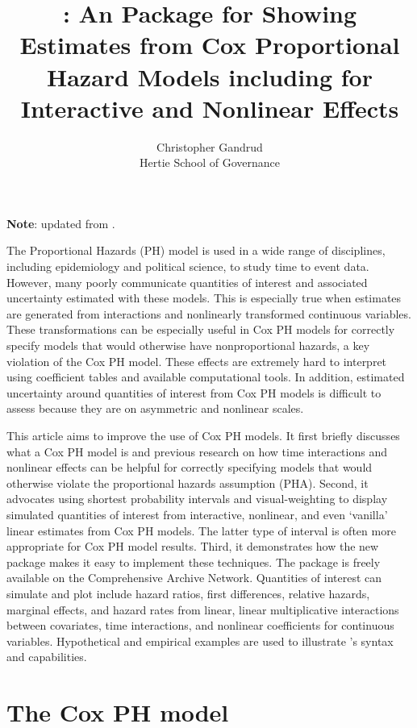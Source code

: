 \documentclass[nojss]{jss}\usepackage[]{graphicx}\usepackage[]{color}
\author{Christopher Gandrud \\ Hertie School of Governance}
\title{\pkg{simPH}: An \proglang{R} Package for Showing Estimates from Cox Proportional Hazard Models including for Interactive and Nonlinear Effects}
\begin{document}
\textbf{Note}: updated from \cite{gandrud2015}.

\vspace{0.5cm}

The \cite{cox1972} Proportional Hazards (PH) model is used in a wide range of disciplines, including epidemiology and political science, to study time to event data. However, many poorly communicate quantities of interest and associated uncertainty estimated with these models. This is especially true when estimates are generated from interactions and nonlinearly transformed continuous variables. These transformations can be especially useful in Cox PH models for correctly specify models that would otherwise have nonproportional hazards, a key violation of the Cox PH model. These effects are extremely hard to interpret using coefficient tables and available computational tools. In addition, estimated uncertainty around quantities of interest from Cox PH models is difficult to assess because they are on asymmetric and nonlinear scales.

This article aims to improve the use of Cox PH models. It first briefly discusses what a Cox PH model is and previous research on how time interactions and nonlinear effects can be helpful for correctly specifying models that would otherwise violate the proportional hazards assumption (PHA). Second, it advocates using shortest probability intervals and visual-weighting to display simulated quantities of interest from interactive, nonlinear, and even `vanilla' linear estimates from Cox PH models. The latter type of interval is often more appropriate for Cox PH model results. Third, it demonstrates how the new  \citep{CiteR} package  \citep{R-simPH} makes it easy to implement these techniques. The package is freely available on the Comprehensive  Archive Network. Quantities of interest  can simulate and plot include hazard ratios, first differences, relative hazards, marginal effects, and hazard rates from linear, linear multiplicative interactions between covariates, time interactions, and nonlinear coefficients for continuous variables. Hypothetical and empirical examples are used to illustrate 's syntax and capabilities.

\section[The Cox PH model]{The Cox PH model}
\end{document}
